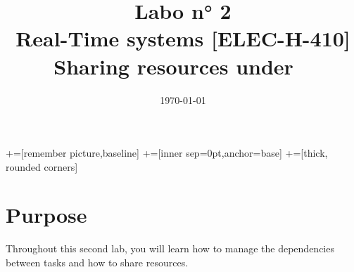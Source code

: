 \documentclass[10pt,a4paper]{article}
\date{\vspace{-1cm}\mydate\today}
\title{\vspace{-2cm} Labo n° 2\\ Real-Time systems [ELEC-H-410]\\ Sharing resources under \uCOSII~\ifthenelse{\boolean{corrige}}{~\\Corrigé}{}}
\theoremstyle{definition}%
\newcommand{\uCOSII}{$\upmu$C/OS-II}
\begin{document}
\newcommand\tabnode[1]{\addtocounter{nodecount}{1} \tikz \node (\arabic{nodecount}) {#1};}

+=[remember picture,baseline]
+=[inner sep=0pt,anchor=base]
+=[thick, rounded corners]



\maketitle
\section*{Purpose}

Throughout this second lab, you will learn how to manage the dependencies between tasks and how to share resources.



 
\end{document}
